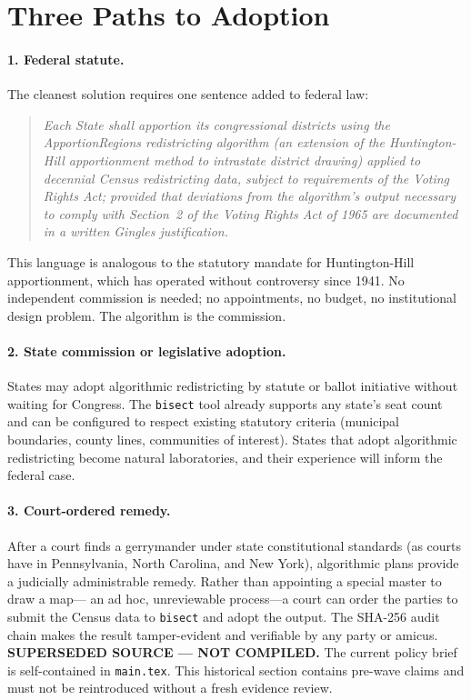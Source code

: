 
\section{Three Paths to Adoption}

\paragraph{1. Federal statute.}
The cleanest solution requires one sentence added to federal law:
\begin{quote}
\textit{Each State shall apportion its congressional districts using
the ApportionRegions redistricting algorithm (an extension of the
Huntington-Hill apportionment method to intrastate district drawing)
applied to decennial Census redistricting data, subject to requirements
of the Voting Rights Act; provided that deviations from the algorithm's
output necessary to comply with Section~2 of the Voting Rights Act of
1965 are documented in a written Gingles justification.}
\end{quote}
This language is analogous to the statutory mandate for Huntington-Hill
apportionment, which has operated without controversy since 1941.
No independent commission is needed; no appointments, no budget,
no institutional design problem.
The algorithm is the commission.

\paragraph{2. State commission or legislative adoption.}
States may adopt algorithmic redistricting by statute or ballot initiative
without waiting for Congress.
The \texttt{bisect} tool already supports any state's seat count
and can be configured to respect existing statutory criteria
(municipal boundaries, county lines, communities of interest).
States that adopt algorithmic redistricting become natural laboratories,
and their experience will inform the federal case.

\paragraph{3. Court-ordered remedy.}
After a court finds a gerrymander under state constitutional standards
(as courts have in Pennsylvania, North Carolina, and New York),
algorithmic plans provide a judicially administrable remedy.
Rather than appointing a special master to draw a map---
an ad hoc, unreviewable process---a court can order the parties
to submit the Census data to \texttt{bisect} and adopt the output.
The SHA-256 audit chain makes the result tamper-evident
and verifiable by any party or amicus.
\noindent\textbf{SUPERSEDED SOURCE --- NOT COMPILED.} The current policy brief
is self-contained in \texttt{main.tex}. This historical section contains
pre-wave claims and must not be reintroduced without a fresh evidence review.
